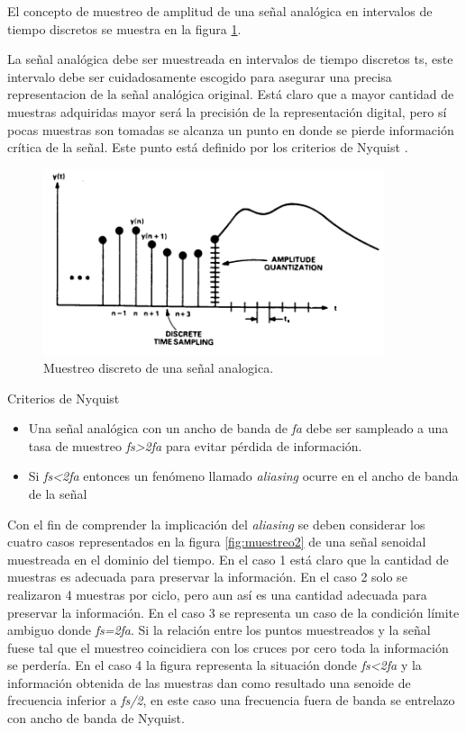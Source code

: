 El concepto de muestreo de amplitud de una señal analógica en intervalos de tiempo discretos se muestra en la figura \ref{fig:muestreo1}.

La señal analógica debe ser muestreada en intervalos de tiempo discretos ts, este intervalo debe ser cuidadosamente escogido para asegurar una precisa representacion de la señal analógica original. Está claro que a mayor cantidad de muestras adquiridas mayor será la precisión de la representación digital, pero sí pocas muestras son tomadas se alcanza un punto en donde se pierde información crítica de la señal. Este punto está definido por los criterios de Nyquist \citep{sampling:appnote}.

\begin{figure}[ht]
	\centering
	\includegraphics[width=100mm]{./Figures/muestreo1.png}
	\caption{Muestreo discreto de una señal analogica.}
	\label{fig:muestreo1}
\end{figure}

Criterios de Nyquist
\begin{itemize}
\item Una señal analógica con un ancho de banda de \textit{fa} debe ser sampleado a una tasa de muestreo \textit{fs>2fa} para evitar pérdida de información.
\item Si \textit{fs<2fa} entonces un fenómeno llamado \textit{aliasing} ocurre en el ancho de banda de la señal
\end{itemize}

Con el fin de comprender la implicación del \textit{aliasing} se deben considerar los cuatro casos representados en la figura \ref{fig:muestreo2} de una señal senoidal muestreada en el dominio del tiempo.
En el caso 1 está claro que la cantidad de muestras es adecuada para preservar la información. En el caso 2 solo se realizaron 4 muestras por ciclo, pero aun así es una cantidad adecuada para preservar la información. En el caso 3 se representa un caso de la condición límite ambiguo donde \textit{fs=2fa}. Si la relación entre los puntos muestreados y la señal fuese tal que el muestreo coincidiera con los cruces por cero toda la información se perdería. En el caso 4 la figura representa la situación donde \textit{fs<2fa} y la información obtenida de las muestras dan como resultado una senoide de frecuencia inferior a \textit{fs/2}, en este caso una frecuencia fuera de banda se entrelazo con ancho de banda de Nyquist. 

